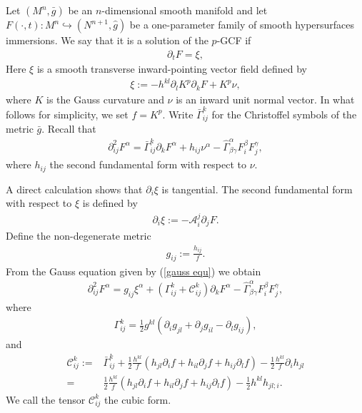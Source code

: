 \documentclass{amsart}
\theoremstyle{definition}
\theoremstyle{remark}
\numberwithin{equation}{section}
\begin{document}
\title[]
 {}

\curraddr{}
\email{}
\date{\today}

\dedicatory{}
\subjclass[2010]{}
\keywords{}

\begin{abstract}

\end{abstract}

\maketitle

Let $(M^n,\bar{g})$ be an $n$-dimensional smooth manifold and let $F(\cdot,t)\colon M^n\hookrightarrow (N^{n+1},\hat{g})$ be a one-parameter family of smooth hypersurfaces immersions. We say that it is a solution of the $ p $-GCF if
\begin{align}
\partial_tF=\xi,
\end{align}
Here $\xi $ is a smooth transverse inward-pointing vector field defined by
\begin{align}
\xi:=-h^{kl}\partial_l K ^{ p }\partial_kF+ K ^{ p }\nu,
\end{align}
 where $ K $ is the Gauss curvature and $\nu$ is an inward unit normal vector. In what follows for simplicity, we set $ f = K ^{ p }.$
Write $\bar{\Gamma}_{ij}^k$ for the Christoffel symbols of the metric $\bar{g}.$ Recall that
\begin{align}\label{gauss equ}
\partial^2_{ij}F^{\alpha}=\bar{\Gamma}_{ij}^k\partial_kF^{\alpha}+h_{ij}\nu^{\alpha}-\hat{\Gamma}^{ \alpha }_{\beta\gamma}F^{\beta}_iF^{\gamma}_j,
\end{align}
where $h_{ij}$ the second fundamental form with respect to $\nu.$

A direct calculation shows that $\partial_i\xi$ is tangential. The second fundamental form with respect to $\xi$ is defined by
\begin{align}
\partial_i\xi:=-\mathcal{A}_i^j\partial_jF.
\end{align}
Define the non-degenerate metric
\begin{align}
g_{ij}:=\frac{h_{ij}}{ f }.
\end{align}
From the Gauss equation given by (\ref{gauss equ}) we obtain
\begin{align}
\partial^2_{ij}F^{\alpha}=g_{ij}\xi^{\alpha}+(\Gamma_{ij}^k+\mathcal{C}_{ij}^k)\partial_kF^{\alpha}-\hat{\Gamma}^{ \alpha }_{\beta\gamma}F^{\beta}_iF^{\gamma}_j,
\end{align}
where
\begin{align}
\Gamma_{ij}^k=\frac{1}{2}g^{kl}\left(\partial_ig_{jl}+\partial_jg_{il}-\partial_lg_{ij}\right),
\end{align}
and
\begin{align}
\mathcal{C}_{ij}^k:=&\bar{\Gamma}_{ij}^k+\frac{1}{2}\frac{h^{kl}}{ f }\left(h_{jl}\partial_i f +h_{il}\partial_j f +h_{ij}\partial_l f \right)-\frac{1}{2}\frac{h^{kl}}{ f }\partial_ih_{jl}\\
=&\frac{1}{2}\frac{h^{kl}}{ f }\left(h_{jl}\partial_i f +h_{il}\partial_j f +h_{ij}\partial_l f \right)-\frac{1}{2}h^{kl}h_{jl;i}.
\end{align}
 We call the tensor $\mathcal{C}_{ij}^k$ the cubic form.
\end{document}
